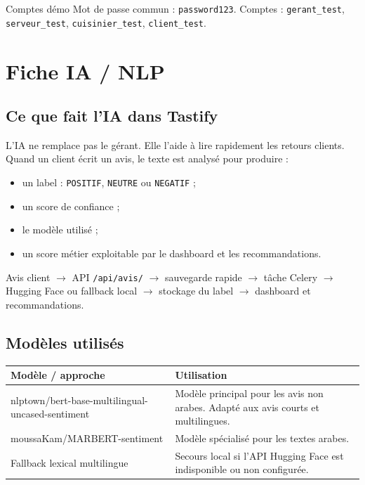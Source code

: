 \documentclass[10pt,a4paper]{article}
\newcommand{\code}[1]{\texttt{#1}}
\begin{document}
\begin{alertbox}{Comptes démo}
Mot de passe commun : \code{password123}. Comptes : \code{gerant\_test}, \code{serveur\_test}, \code{cuisinier\_test}, \code{client\_test}.
\end{alertbox}

\section{Fiche IA / NLP}

\subsection{Ce que fait l'IA dans Tastify}

L'IA ne remplace pas le gérant. Elle l'aide à lire rapidement les retours clients. Quand un client écrit un avis, le texte est analysé pour produire :
\begin{itemize}
  \item un label : \code{POSITIF}, \code{NEUTRE} ou \code{NEGATIF} ;
  \item un score de confiance ;
  \item le modèle utilisé ;
  \item un score métier exploitable par le dashboard et les recommandations.
\end{itemize}

\begin{tcolorbox}[title=\textbf{Pipeline de sentiment}]
Avis client $\rightarrow$ API \code{/api/avis/} $\rightarrow$ sauvegarde rapide $\rightarrow$ tâche Celery $\rightarrow$ Hugging Face ou fallback local $\rightarrow$ stockage du label $\rightarrow$ dashboard et recommandations.
\end{tcolorbox}

\subsection{Modèles utilisés}

\begin{tabularx}{\textwidth}{p{4.2cm}Y}
\toprule
\textbf{Modèle / approche} & \textbf{Utilisation} \\
\midrule
\footnotesize\ttfamily nlptown/bert-base-\newline multilingual-uncased-\newline sentiment & Modèle principal pour les avis non arabes. Adapté aux avis courts et multilingues. \\
\footnotesize\ttfamily moussaKam/\newline MARBERT-sentiment & Modèle spécialisé pour les textes arabes. \\
Fallback lexical multilingue & Secours local si l'API Hugging Face est indisponible ou non configurée. \\
\bottomrule
\end{tabularx}
\end{document}
